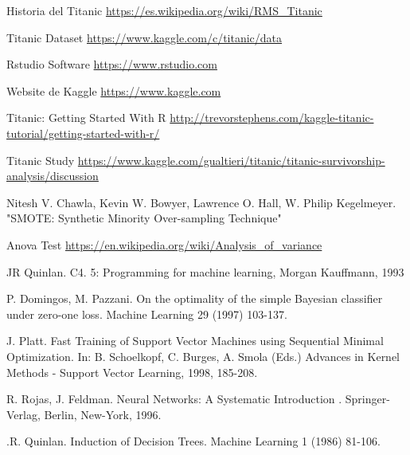 % 

\begin{thebibliography}{99}

	\emph{} Historia del Titanic \url{https://es.wikipedia.org/wiki/RMS_Titanic}

	\emph{} Titanic Dataset \url{https://www.kaggle.com/c/titanic/data}		
	
	\emph{} Rstudio Software \url{https://www.rstudio.com}

	\emph{} Website de Kaggle \url{https://www.kaggle.com}	
	
	\emph{} Titanic: Getting Started With R \url{http://trevorstephens.com/kaggle-titanic-tutorial/getting-started-with-r/}
	
	\emph{} Titanic Study \url{https://www.kaggle.com/gualtieri/titanic/titanic-survivorship-analysis/discussion}	
	
	\emph{}Nitesh V. Chawla, Kevin W. Bowyer, Lawrence O. Hall, W. Philip Kegelmeyer. "SMOTE: Synthetic Minority Over-sampling Technique"
	
	\emph{} Anova Test \url{https://en.wikipedia.org/wiki/Analysis_of_variance}
	
	\emph{}JR Quinlan. C4. 5: Programming for machine learning, Morgan Kauffmann, 1993

	\emph{} P. Domingos, M. Pazzani. On the optimality of the simple Bayesian classifier under zero-one loss. Machine Learning 29 (1997) 103-137.

	\emph{} J. Platt. Fast Training of Support Vector Machines using Sequential Minimal Optimization. In: B. Schoelkopf, C. Burges, A. Smola (Eds.) Advances in Kernel Methods - Support Vector Learning, 1998, 185-208.
	
	\emph{} R. Rojas, J. Feldman. Neural Networks: A Systematic Introduction . Springer-Verlag, Berlin, New-York, 1996.
	
	\emph{} .R. Quinlan. Induction of Decision Trees. Machine Learning 1 (1986) 81-106.
				
		
\end{thebibliography}
